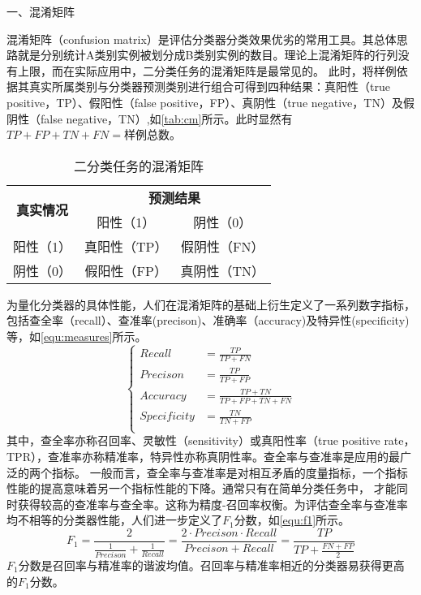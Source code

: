 一、混淆矩阵

混淆矩阵（confusion matrix）是评估分类器分类效果优劣的常用工具\cite{Zhou2016,Aurélien2018}。其总体思路就是分别统计A类别实例被划分成B类别实例的数目。理论上混淆矩阵的行列没有上限，而在实际应用中，二分类任务的混淆矩阵是最常见的。
此时，将样例依据其真实所属类别与分类器预测类别进行组合可得到四种结果：真阳性（true positive，TP）、假阳性（false positive，FP）、真阴性（true negative，TN）及假阴性（false negative，TN）,如\autoref{tab:cm}所示。此时显然有
$TP+FP+TN+FN=\text{样例总数}$。
\begin{table}[htbp]
      \centering
      \caption{\label{tab:cm}二分类任务的混淆矩阵}
      \begin{tabular}{ccc}
      \toprule
      \multicolumn{1}{c}{\multirow{2}[4]{*}{\textbf{真实情况}}} & \multicolumn{2}{c}{\textbf{预测结果}} \\
            \cmidrule{2-3}          & 阳性（1） & 阴性（0） \\
      \midrule
      阳性（1） & 真阳性（TP） & 假阴性（FN） \\
      阴性（0） & 假阳性（FP） & 真阴性（TN） \\
      \bottomrule
      \end{tabular}%
\end{table}%

为量化分类器的具体性能，人们在混淆矩阵的基础上衍生定义了一系列数字指标，包括查全率（recall）、查准率(precison)、准确率（accuracy)及特异性(specificity)等，如\autoref{equ:measures}所示。
\begin{equation}
      \label{equ:measures}
      \left \{
      \begin{aligned}
            Recall      &=\frac{TP}{TP+FN}         \\
            Precison    &=\frac{TP}{TP+FP}          \\
            Accuracy    &=\frac{TP+TN}{TP+FP+TN+FN} \\
            Specificity &=\frac{TN}{TN+FP}       \\
      \end{aligned}
      \right.
\end{equation}
其中，查全率亦称召回率、灵敏性（sensitivity）或真阳性率（true positive rate，TPR），查准率亦称精准率，特异性亦称真阴性率。查全率与查准率是应用的最广泛的两个指标\cite{Zhou2016,Aurélien2018}。
一般而言，查全率与查准率是对相互矛盾的度量指标，一个指标性能的提高意味着另一个指标性能的下降。通常只有在简单分类任务中，
才能同时获得较高的查准率与查全率。这称为精度-召回率权衡。为评估查全率与查准率均不相等的分类器性能，人们进一步定义了$F_1\text{分数}$，如\autoref{equ:f1}所示。
\begin{equation}
      \label{equ:f1}
      F_1=\frac{2}{\frac{1}{Precison}+\frac{1}{Recall}}=\frac{2\cdot Precison\cdot Recall}{Precison+Recall}=\frac{TP}{TP+\frac{FN+FP}{2}}
\end{equation}
$F_1\text{分数}$是召回率与精准率的谐波均值。召回率与精准率相近的分类器易获得更高的$F_1\text{分数}$。

